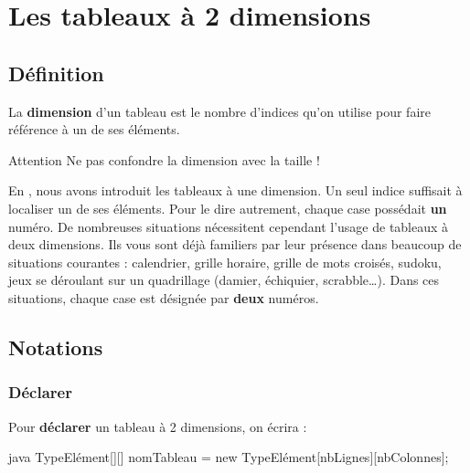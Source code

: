 \chapter{Les tableaux à 2 dimensions}

\section{Définition}

	La \textbf{dimension} d’un tableau est le nombre d’indices qu’on utilise
	pour faire référence à un de ses éléments. 
	
	\begin{infotbox}{Attention}
		Ne pas confondre la dimension avec la taille !
	\end{infotbox}		
	
	En , nous avons introduit les tableaux à une dimension.
	Un seul indice suffisait à localiser un de ses éléments. 
	Pour le dire autrement,
	chaque case possédait \textbf{un} numéro.
	De nombreuses situations nécessitent cependant l’usage de tableaux à deux dimensions.
	Ils vous sont déjà familiers par leur présence dans beaucoup de
	situations courantes : calendrier, grille horaire, grille de mots
	croisés, sudoku, jeux se déroulant sur un quadrillage (damier,
	échiquier, scrabble\dots).
	Dans ces situations, 
	chaque case est désignée par \textbf{deux} numéros.

\section{Notations}

	\subsection{Déclarer}
		
		Pour \textbf{déclarer} un tableau à 2 dimensions, on écrira :
	
		\begin{algo}
			\;
		\end{algo}
		\begin{Code}{java}
		  TypeElément[][] nomTableau = new TypeElément[nbLignes][nbColonnes];
		\end{Code}
	
